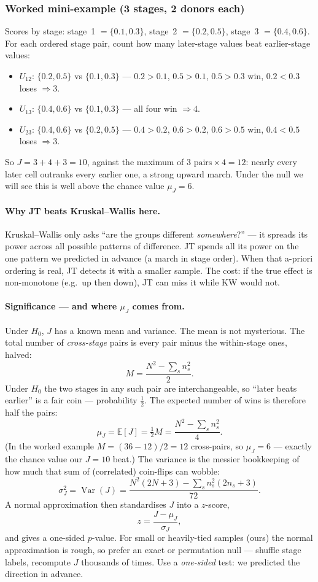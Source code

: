 \documentclass[11pt]{article}
\begin{document}
\subsubsection*{Worked mini-example (3 stages, 2 donors each)}
Scores by stage: stage~1 $=\{0.1,0.3\}$, stage~2 $=\{0.2,0.5\}$, stage~3 $=\{0.4,0.6\}$. For each ordered stage pair, count how many later-stage values beat earlier-stage values:
\begin{itemize}[leftmargin=*,topsep=2pt]
  \item $U_{12}$: $\{0.2,0.5\}$ vs $\{0.1,0.3\}$ --- $0.2{>}0.1$, $0.5{>}0.1$, $0.5{>}0.3$ win, $0.2{<}0.3$ loses $\Rightarrow 3$.
  \item $U_{13}$: $\{0.4,0.6\}$ vs $\{0.1,0.3\}$ --- all four win $\Rightarrow 4$.
  \item $U_{23}$: $\{0.4,0.6\}$ vs $\{0.2,0.5\}$ --- $0.4{>}0.2$, $0.6{>}0.2$, $0.6{>}0.5$ win, $0.4{<}0.5$ loses $\Rightarrow 3$.
\end{itemize}
So $J = 3+4+3 = 10$, against the maximum of $3\text{ pairs}\times 4 = 12$: nearly every later cell outranks every earlier one, a strong upward march. Under the null we will see this is well above the chance value $\mu_J = 6$.

\paragraph{Why JT beats Kruskal--Wallis here.} Kruskal--Wallis only asks ``are the groups different \emph{somewhere}?'' --- it spreads its power across all possible patterns of difference. JT spends all its power on the one pattern we predicted in advance (a march in stage order). When that a-priori ordering is real, JT detects it with a smaller sample. The cost: if the true effect is non-monotone (e.g.\ up then down), JT can miss it while KW would not.

\paragraph{Significance --- and where $\mu_J$ comes from.} Under $H_0$, $J$ has a known mean and variance. The mean is not mysterious. The total number of \emph{cross-stage} pairs is every pair minus the within-stage ones, halved:
\[
M = \frac{N^2 - \sum_s n_s^2}{2}.
\]
Under $H_0$ the two stages in any such pair are interchangeable, so ``later beats earlier'' is a fair coin --- probability $\tfrac12$. The expected number of wins is therefore half the pairs:
\[
\mu_J = \mathbb{E}[J] = \tfrac12 M = \frac{N^2 - \sum_s n_s^2}{4}.
\]
(In the worked example $M = (36-12)/2 = 12$ cross-pairs, so $\mu_J = 6$ --- exactly the chance value our $J=10$ beat.) The variance is the messier bookkeeping of how much that sum of (correlated) coin-flips can wobble:
\[
\sigma_J^2 = \operatorname{Var}(J) = \frac{N^2(2N+3) - \sum_{s} n_s^2(2n_s+3)}{72}.
\]
A normal approximation then standardises $J$ into a $z$-score,
\[
z = \frac{J - \mu_J}{\sigma_J},
\]
and gives a one-sided $p$-value. For small or heavily-tied samples (ours) the normal approximation is rough, so prefer an exact or permutation null --- shuffle stage labels, recompute $J$ thousands of times. Use a \emph{one-sided} test: we predicted the direction in advance.
\end{document}

